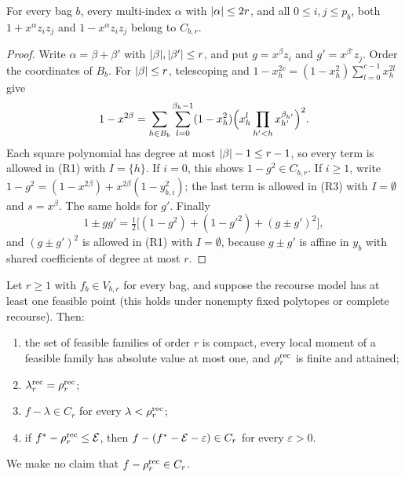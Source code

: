 \begin{lemma}\label{lem:rec-order-unit}
For every bag $b$, every multi-index $\alpha$ with $\lvert \alpha\rvert\le2r$, and
all $0\le i,j\le p_b$, both $1+x^\alpha z_iz_j$ and $1-x^\alpha z_iz_j$
belong to $C_{b,r}$.
\end{lemma}

\begin{proof}
Write $\alpha=\beta+\beta'$ with $\lvert \beta\rvert,\lvert \beta'\rvert\le r$, and put
$g=x^\beta z_i$ and $g'=x^{\beta'}z_j$. Order the coordinates of $B_b$. For
$\lvert \beta\rvert\le r$, telescoping and $1-x_h^{2c}=(1-x_h^2)\sum_{l=0}^{c-1}
x_h^{2l}$ give
\begin{equation}\label{eq:rec-telescope-monomial}
  1-x^{2\beta}=\sum_{h\in B_b}\sum_{l=0}^{\beta_h-1}(1-x_h^2)
  \Bigl(x_h^l\prod_{h'<h}x_{h'}^{\beta_{h'}}\Bigr)^2 .
\end{equation}
Each square polynomial has degree at most $\lvert \beta\rvert-1\le r-1$, so every
term is allowed in (R1) with $I=\{h\}$. If $i=0$, this shows $1-g^2\in
C_{b,r}$. If $i\ge1$, write $1-g^2=(1-x^{2\beta})+x^{2\beta}(1-y_{b,i}^2)$;
the last term is allowed in (R3) with $I=\emptyset$ and $s=x^\beta$. The
same holds for $g'$. Finally
\[
  1\pm gg'=\tfrac12\bigl[(1-g^2)+(1-g'^2)+(g\pm g')^2\bigr],
\]
and $(g\pm g')^2$ is allowed in (R1) with $I=\emptyset$, because $g\pm g'$
is affine in $y_b$ with shared coefficients of degree at most $r$.
\end{proof}

\begin{proposition}\label{prop:rec-dual}
Let $r\ge1$ with $f_b\in V_{b,r}$ for every bag, and suppose the recourse
model has at least one feasible point
(this holds under nonempty fixed polytopes or complete recourse). Then:
\begin{enumerate}[label=(\roman*)]
\item the set of feasible families of order $r$ is compact, every local
  moment of a feasible family has absolute value at most one, and
  $\rho^{\mathrm{rec}}_r$ is finite and attained;
\item $\lambda^{\mathrm{rec}}_r=\rho^{\mathrm{rec}}_r$;
\item $f-\lambda\in C_r$ for every $\lambda<\rho^{\mathrm{rec}}_r$;
\item if $f^{*}-\rho^{\mathrm{rec}}_r\le\mathcal E$, then
  $f-(f^{*}-\mathcal E-\varepsilon)\in C_r$ for every $\varepsilon>0$.
\end{enumerate}
We make no claim that $f-\rho^{\mathrm{rec}}_r\in C_r$.
\end{proposition}

